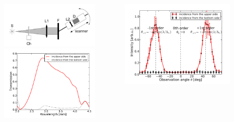 \documentclass{beamer}
\begin{document}
\begin{frame}
	\begin{columns}
		\begin{column}{0.5\textwidth}
			\begin{figure}[htb]
				\includegraphics[width=\textwidth]{../images/dmg/letters_exp_setup.png}\\
				\includegraphics[width=\textwidth]{../images/dmg/letters_spect.png}\\
			\end{figure}
		\end{column}
		\begin{column}{0.5\textwidth}
				\includegraphics[width=\textwidth]{../images/dmg/letters_exp.png}\\

\end{column}
\end{columns}
\end{frame}
\end{document}
